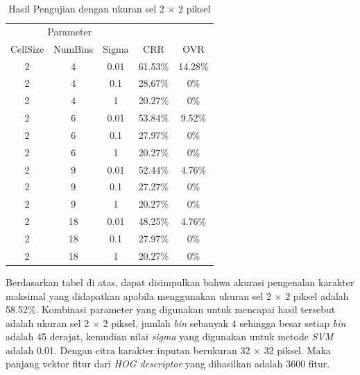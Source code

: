 \begin{longtable}[c]{|c|c|c|c|c|}
	\caption{Hasil Pengujian dengan ukuran sel 2 $\times$ 2 piksel}
	\label{tab:HasilPengujianSel2}\\
	\hline
	\multicolumn{3}{|c|}{Parameter} &                                &                                \\ \cline{1-3}
	CellSize   & NumBins   & Sigma  & \multirow{-2}{*}{CRR}          & \multirow{-2}{*}{OVR}          \\ \hline
	\endhead
	2          & 4         & 0.01   & {\color[HTML]{FE0000} 61.53\%} & {\color[HTML]{FE0000} 14.28\%} \\ \hline
	2          & 4         & 0.1    & 28.67\%                        & 0\%                            \\ \hline
	2          & 4         & 1      & 20.27\%                        & 0\%                            \\ \hline
	2          & 6         & 0.01   & 53.84\%                        & 9.52\%                         \\ \hline
	2          & 6         & 0.1    & 27.97\%                        & 0\%                            \\ \hline
	2          & 6         & 1      & 20.27\%                        & 0\%                            \\ \hline
	2          & 9         & 0.01   & 52.44\%                        & 4.76\%                         \\ \hline
	2          & 9         & 0.1    & 27.27\%                        & 0\%                            \\ \hline
	2          & 9         & 1      & 20.27\%                        & 0\%                            \\ \hline
	2          & 18        & 0.01   & 48.25\%                        & 4.76\%                         \\ \hline
	2          & 18        & 0.1    & 27.97\%                        & 0\%                            \\ \hline
	2          & 18        & 1      & 20.27\%                        & 0\%                            \\ \hline
\end{longtable}
\noindent Berdasarkan tabel di atas, dapat disimpulkan bahwa akurasi pengenalan karakter maksimal yang didapatkan apabila menggunakan ukuran sel 2 $\times$ 2 piksel adalah 58.52\%. Kombinasi parameter yang digunakan untuk mencapai hasil tersebut adalah ukuran sel 2 $\times$ 2 piksel, jumlah \textit{bin} sebanyak 4 sehingga besar setiap \textit{bin} adalah 45 derajat, kemudian nilai \textit{sigma} yang digunakan untuk metode \textit{SVM} adalah 0.01. Dengan citra karakter inputan berukuran 32 $\times$ 32 piksel. Maka panjang vektor fitur dari \textit{HOG descriptor} yang dihasilkan adalah 3600 fitur.

